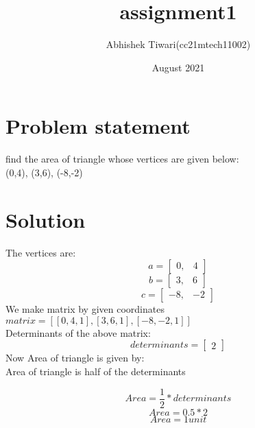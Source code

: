 \documentclass{article}
\title{assignment1}
\author{Abhishek Tiwari(cc21mtech11002) }
\date{August 2021}
\begin{document}
\maketitle

\section{Problem statement}
find the area of triangle whose vertices are given below:\\ (0,4), (3,6), (-8,-2)

\section{Solution}

The vertices are:
 $$a= \begin{bmatrix} 
     0, &  4 
  \end{bmatrix}$$
 $$b= \begin{bmatrix} 
    3, &  6 
  \end{bmatrix}$$
 $$c =\begin{bmatrix} 
    -8, &  -2 
  \end{bmatrix}$$
  We make matrix by given coordinates\\ 
  $ matrix = [[0,4, 1],
              [3, 6, 1],
              [-8, -2, 1]]$\\
  Determinants of the above matrix:\\
  $$ determinants= \begin{bmatrix} 
     2 
  \end{bmatrix}$$
  Now Area of triangle is given by:\\
  Area of triangle is half of the determinants
  
  $$Area= \frac{1}{2}* determinants $$
$$Area =0.5* 2 $$
$$Area = 1 unit $$
\end{document}
